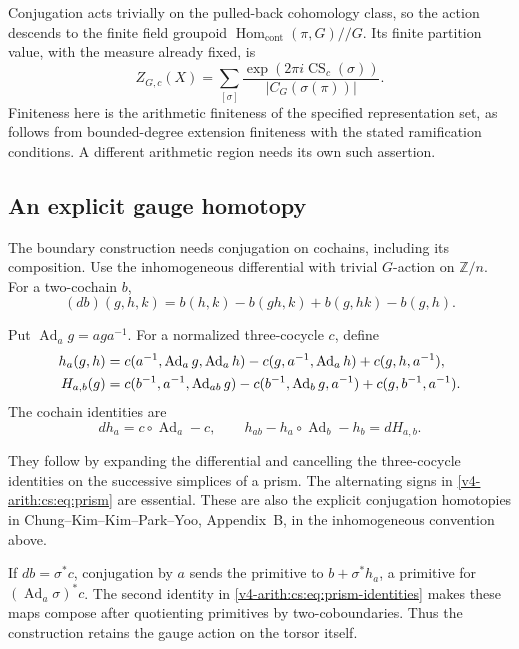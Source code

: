 Conjugation acts trivially on the pulled-back cohomology class, so the
action descends to the finite field groupoid
\(\operatorname{Hom}_{\mathrm{cont}}(\pi,G)//G\). Its finite partition
value, with the measure already fixed, is
\begin{equation}
 Z_{G,c}(X)=\sum_{[\sigma]}
 \frac{\exp(2\pi i\operatorname{CS}_c(\sigma))}
      {|C_G(\sigma(\pi))|}.
 \label{v4-arith:cs:eq:arithmetic-sum}
\end{equation}
Finiteness here is the arithmetic finiteness of the specified representation
set, as follows from bounded-degree extension finiteness with the stated
ramification conditions. A different arithmetic region needs its own such
assertion.

\subsection{An explicit gauge homotopy}

The boundary construction needs conjugation on cochains, including its
composition. Use the inhomogeneous differential with trivial \(G\)-action on
\(\mathbb Z/n\). For a two-cochain \(b\),
\[
 (db)(g,h,k)=b(h,k)-b(gh,k)+b(g,hk)-b(g,h).
\]

Put \(\operatorname{Ad}_a g=aga^{-1}\). For a normalized three-cocycle
\(c\), define
\begin{align}
 h_a(g,h)={}&c(a^{-1},\operatorname{Ad}_ag,\operatorname{Ad}_ah)
       -c(g,a^{-1},\operatorname{Ad}_ah)
       +c(g,h,a^{-1}),
 \label{v4-arith:cs:eq:prism}\\
 H_{a,b}(g)={}&c(b^{-1},a^{-1},\operatorname{Ad}_{ab}g)
       -c(b^{-1},\operatorname{Ad}_bg,a^{-1})
       +c(g,b^{-1},a^{-1}).\notag
\end{align}
The cochain identities are
\begin{equation}
 dh_a=c\circ\operatorname{Ad}_a-c,
 \qquad
 h_{ab}-h_a\circ\operatorname{Ad}_b-h_b=dH_{a,b}.
 \label{v4-arith:cs:eq:prism-identities}
\end{equation}

They follow by expanding the differential and cancelling the three-cocycle
identities on the successive simplices of a prism. The alternating signs in
\eqref{v4-arith:cs:eq:prism} are essential. These are also the explicit
conjugation homotopies in Chung--Kim--Kim--Park--Yoo, Appendix~B, in the
inhomogeneous convention above.

If \(db=\sigma^*c\), conjugation by \(a\) sends the primitive to
\(b+\sigma^*h_a\), a primitive for \((\operatorname{Ad}_a\sigma)^*c\). The
second identity in \eqref{v4-arith:cs:eq:prism-identities} makes these maps
compose after quotienting primitives by two-coboundaries. Thus the
construction retains the gauge action on the torsor itself.

